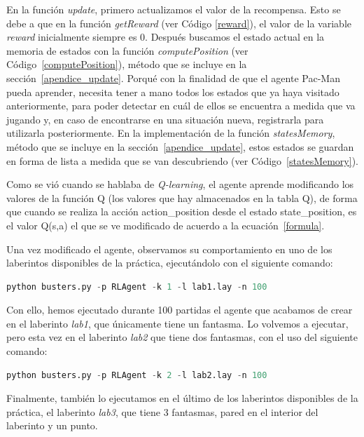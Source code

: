 \documentclass[11pt]{exam}
\begin{document}
En la función \textit{update}, primero actualizamos el valor de la recompensa. Esto se debe a que en la función \textit{getReward} (ver Código \ref{reward}), el valor de la variable \textit{reward} inicialmente siempre es 0. Después buscamos el estado actual en la memoria de estados con la función \textit{computePosition} (ver Código~\ref{computePosition}), método que se incluye en la sección~\ref{apendice_update}. Porqué con la finalidad de que el agente Pac-Man pueda aprender, necesita tener a mano todos los estados que ya haya visitado anteriormente, para poder detectar en cuál de ellos se encuentra a medida que va jugando y, en caso de encontrarse en una situación nueva, registrarla para utilizarla posteriormente. En la implementación de la función \textit{statesMemory}, método que se incluye en la sección~\ref{apendice_update}, estos estados se guardan en forma de lista a medida que se van descubriendo (ver Código~\ref{statesMemory}).

Como se vió cuando se hablaba de \textit{Q-learning}, el agente aprende modificando los valores
de la función Q (los valores que hay almacenados en la tabla Q), de forma que cuando se
realiza la acción action\_position desde el estado state\_position, es el valor Q(s,a) el que se ve modificado de acuerdo a
la ecuación~\ref{formula}.

Una vez modificado el agente, observamos su comportamiento en uno de los laberintos disponibles de la práctica, ejecutándolo con el siguiente comando:

\begin{lstlisting}[language=python, basicstyle=\footnotesize]
python busters.py -p RLAgent -k 1 -l lab1.lay -n 100
\end{lstlisting}

Con ello, hemos ejecutado durante 100 partidas el agente que acabamos de crear en el laberinto \textit{lab1}, que únicamente tiene un fantasma. Lo volvemos a ejecutar, pero esta vez en el laberinto \textit{lab2} que tiene dos fantasmas, con el uso del siguiente comando:

\begin{lstlisting}[language=python, basicstyle=\footnotesize]
python busters.py -p RLAgent -k 2 -l lab2.lay -n 100
\end{lstlisting}

Finalmente, también lo ejecutamos en el último de los laberintos disponibles de la práctica, el laberinto \textit{lab3}, que tiene 3 fantasmas, pared en el interior del laberinto y un punto.
\end{document}
